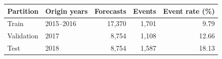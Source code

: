 \begin{tabular}{llrrr}
\toprule
Partition & Origin years & Forecasts & Events & Event rate (\%) \\
\midrule
Train & 2015--2016 & 17,370 & 1,701 & 9.79 \\
Validation & 2017 & 8,754 & 1,108 & 12.66 \\
Test & 2018 & 8,754 & 1,587 & 18.13 \\
\bottomrule
\end{tabular}
